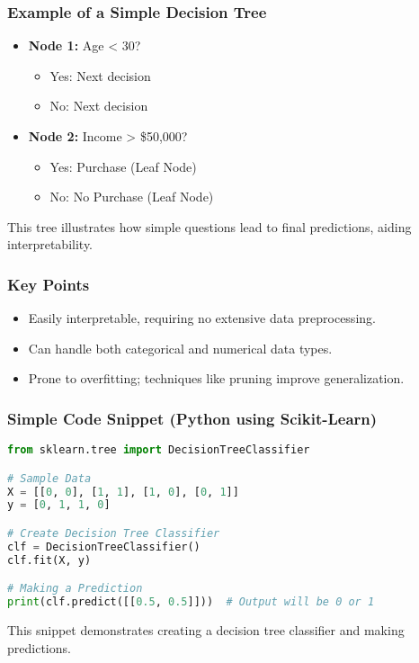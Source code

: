 \documentclass[aspectratio=169]{beamer}
\begin{document}
\begin{frame}[fragile]
    \frametitle{Example of a Simple Decision Tree}
    \begin{itemize}
        \item \textbf{Node 1:} Age < 30?
        \begin{itemize}
            \item Yes: Next decision
            \item No: Next decision
        \end{itemize}
        \item \textbf{Node 2:} Income > \$50,000?
        \begin{itemize}
            \item Yes: Purchase (Leaf Node)
            \item No: No Purchase (Leaf Node)
        \end{itemize}
    \end{itemize}
    This tree illustrates how simple questions lead to final predictions, aiding interpretability.
\end{frame}

\begin{frame}[fragile]
    \frametitle{Key Points}
    \begin{itemize}
        \item Easily interpretable, requiring no extensive data preprocessing.
        \item Can handle both categorical and numerical data types.
        \item Prone to overfitting; techniques like pruning improve generalization.
    \end{itemize}
\end{frame}

\begin{frame}[fragile]
    \frametitle{Simple Code Snippet (Python using Scikit-Learn)}
    \begin{lstlisting}[language=Python]
from sklearn.tree import DecisionTreeClassifier

# Sample Data
X = [[0, 0], [1, 1], [1, 0], [0, 1]]
y = [0, 1, 1, 0]

# Create Decision Tree Classifier
clf = DecisionTreeClassifier()
clf.fit(X, y)

# Making a Prediction
print(clf.predict([[0.5, 0.5]]))  # Output will be 0 or 1
    \end{lstlisting}
    This snippet demonstrates creating a decision tree classifier and making predictions.
\end{frame}
\end{document}
